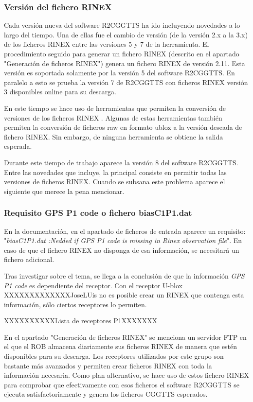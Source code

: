 \subsubsection{Versión del fichero RINEX}
Cada versión nueva del software R2CGGTTS ha ido incluyendo novedades a lo largo del tiempo. Una de ellas fue el cambio de versión (de la versión 2.x a la 3.x) de los ficheros RINEX entre las versiones 5 y 7 de la herramienta. El procedimiento seguido para generar un fichero RINEX (descrito en el apartado "Generación de ficheros RINEX") genera un fichero RINEX de versión 2.11. Esta versión es soportada solamente por la versión 5 del software R2CGGTTS. En paralelo a esto se prueba la versión 7 de R2CGGTTS con ficheros RINEX versión 3 disponibles online para su descarga.  \newline

En este tiempo se hace uso de herramientas que permiten la conversión de versiones de los ficheros RINEX \cite{gnssconverter}. Algunas de estas herramientas también permiten la conversión de ficheros raw en formato ublox a la versión deseada de fichero RINEX. Sin embargo, de ninguna herramienta se obtiene la salida esperada. \newline

Durante este tiempo de trabajo aparece la versión 8 del software R2CGGTTS. Entre las novedades que incluye, la principal consiste en permitir todas las versiones de ficheros RINEX. Cuando se subsana este problema aparece el siguiente que merece la pena mencionar.

\subsubsection{Requisito GPS P1 code o fichero biasC1P1.dat}
En la documentación, en el apartado de ficheros de entrada aparece un requisito: "\textit{biasC1P1.dat :Nedded if GPS P1 code is missing in Rinex observation file}". En caso de que el fichero RINEX no disponga de esa información, se necesitará un fichero adicional. \newline

Tras investigar sobre el tema, se llega a la conclusión de que la información \textit{GPS P1 code} es dependiente del receptor. Con el receptor U-blox XXXXXXXXXXXXXJoseLUis no es posible crear un RINEX que contenga esta información, sólo ciertos receptores lo permiten. \newline

XXXXXXXXXXLista de receptores P1XXXXXXX \newline

En el apartado "Generación de ficheros RINEX" se menciona un servidor FTP en el que el ROB almacena diariamente sus ficheros RINEX de manera que estén disponibles para su descarga. Los receptores utilizados por este grupo son bastante más avanzados y permiten crear ficheros RINEX con toda la información necesaria. Como plan alternativo, se hace uso de estos fichero RINEX para comprobar que efectivamente con esos ficheros el software R2CGGTTS se ejecuta satisfactoriamente y genera los ficheros CGGTTS esperados.


